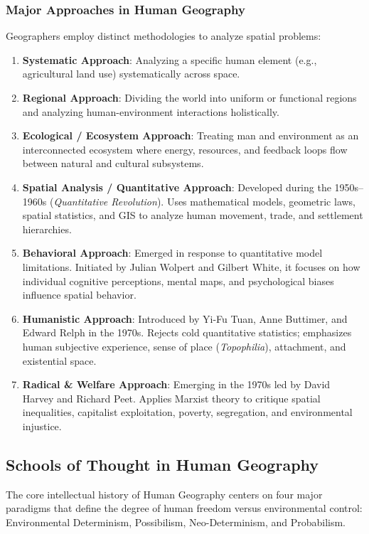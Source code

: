 \documentclass[11pt,a4paper]{article}
\begin{document}
\subsubsection{Major Approaches in Human Geography}
Geographers employ distinct methodologies to analyze spatial problems:
\begin{enumerate}[leftmargin=*]
  \item \textbf{Systematic Approach}: Analyzing a specific human element (e.g., agricultural land use) systematically across space.
  \item \textbf{Regional Approach}: Dividing the world into uniform or functional regions and analyzing human-environment interactions holistically.
  \item \textbf{Ecological / Ecosystem Approach}: Treating man and environment as an interconnected ecosystem where energy, resources, and feedback loops flow between natural and cultural subsystems.
  \item \textbf{Spatial Analysis / Quantitative Approach}: Developed during the 1950s--1960s (\textit{Quantitative Revolution}). Uses mathematical models, geometric laws, spatial statistics, and GIS to analyze human movement, trade, and settlement hierarchies.
  \item \textbf{Behavioral Approach}: Emerged in response to quantitative model limitations. Initiated by Julian Wolpert and Gilbert White, it focuses on how individual cognitive perceptions, mental maps, and psychological biases influence spatial behavior.
  \item \textbf{Humanistic Approach}: Introduced by Yi-Fu Tuan, Anne Buttimer, and Edward Relph in the 1970s. Rejects cold quantitative statistics; emphasizes human subjective experience, sense of place (\textit{Topophilia}), attachment, and existential space.
  \item \textbf{Radical \& Welfare Approach}: Emerging in the 1970s led by David Harvey and Richard Peet. Applies Marxist theory to critique spatial inequalities, capitalist exploitation, poverty, segregation, and environmental injustice.
\end{enumerate}

\newpage
\subsection{Schools of Thought in Human Geography}

\begin{modelbox}
The core intellectual history of Human Geography centers on four major paradigms that define the degree of human freedom versus environmental control: Environmental Determinism, Possibilism, Neo-Determinism, and Probabilism.
\end{modelbox}
\end{document}
